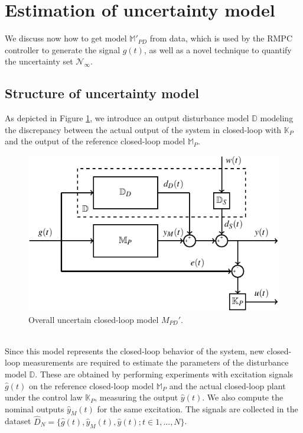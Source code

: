 \documentclass[letterpaper, 10 pt, conference]{ieeeconf}  %
\begin{document}
\section{Estimation of uncertainty model}
\label{Contribution}
We discuss now how to get model $\mathbb{M}'_{PD}$ from data, 
which is used by the RMPC controller to generate the signal $g(t)$, as well as a novel technique to quantify the uncertainty set $\mathcal{N}_{\infty}$.

\subsection{Structure of uncertainty model}
As depicted in Figure \ref{Appended}, we introduce an output disturbance model $\mathbb{D}$ modeling the discrepancy between the actual output of the system in closed-loop with  $\mathbb{K}_P$ and the output of the reference closed-loop model $\mathbb{M}_P$. 
	\begin{figure}[h!]
		\hspace{30pt}
		\includegraphics[scale = 0.7]{Mp-D-E.pdf}
		\caption{Overall uncertain closed-loop model $M_{PD}'$.}
		\label{Appended}
	\end{figure}
	\vspace{-5pt} \\
Since this model represents the closed-loop behavior of the system, new closed-loop measurements are required to estimate the parameters of the disturbance model $\mathbb{D}$. These are obtained by performing experiments with excitation signals $\hat{g}(t)$ on the reference closed-loop model $\mathbb{M}_P$ and the actual closed-loop plant under the control law $\mathbb{K}_P$, measuring the output $\hat{y}(t)$. We also compute
the nominal outputs $\hat{y}_M(t)$ for the same excitation. 
The signals are collected in the dataset $\hat{D}_{N}=\{\hat{g}(t),\hat{y}_M(t),\hat{y}(t);t\in{1,...,N}\}$.
\end{document}
